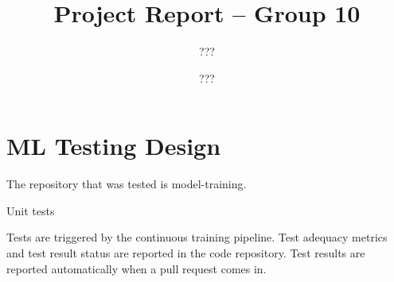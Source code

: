 \documentclass[sigconf,nonacm]{acmart}
\title{Project Report -- Group 10}
\author{???}
\author{???}
\begin{document}

% 

\maketitle





\section{ML Testing Design}

The repository that was tested is model-training.

Unit tests

Tests are triggered by the continuous training pipeline. Test adequacy metrics and test result status
are reported in the code repository. Test results are reported automatically when a pull request
comes in.




\end{document}
